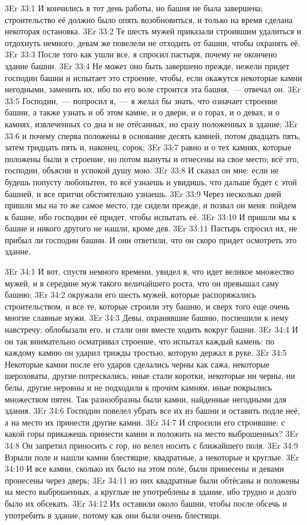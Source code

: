 \vs 3Er 33:1
И кончились в тот день
работы, но башня не была завершена; строительство её должно было опять
возобновиться, и только на время сделана некоторая остановка.
\vs 3Er 33:2
Те шесть мужей приказали
строившим удалиться и отдохнуть немного; девам же повелели не отходить от
башни, чтобы охранять её.
\vs 3Er 33:3
После того как ушли все, я
спросил пастыря, почему не окончено здание башни.
\vs 3Er 33:4
Не может оно быть
завершено прежде, нежели придет господин башни и испытает это строение, чтобы,
если окажутся некоторые камни негодными, заменить их, ибо по его воле строится
эта башня,~--- отвечал он.
\vs 3Er 33:5
Господин,~--- попросил я,~---
я желал бы знать, что означает строение башни, а также узнать и об этом камне,
и о двери, и о горах, и о девах, и о камнях, извлеченных со дна и не
отёсанных, но сразу положенных в здание;
\vs 3Er 33:6
и почему сперва положены в
основание десять камней, потом двадцать пять, затем тридцать пять и, наконец,
сорок;
\vs 3Er 33:7
равно и о тех камнях,
которые положены были в строение, но потом вынуты и отнесены на свое место;
всё это, господин, объясни и успокой душу мою.
\vs 3Er 33:8
И сказал он мне: если не
будешь попусту любопытен, то всё узнаешь и увидишь, что дальше будет с этой
башней, и все притчи обстоятельно узнаешь.
\vs 3Er 33:9
Через несколько дней
пришли мы на то же самое место, где сидели прежде, и позвал он меня: пойдем к
башне, ибо господин её придет, чтобы испытать её.
\vs 3Er 33:10
И пришли мы к башне и
никого другого не нашли, кроме дев.
\vs 3Er 33:11
Пастырь спросил их, не
прибыл ли господин башни. И они ответили, что он скоро придет осмотреть это
здание.

\vs 3Er 34:1
И вот, спустя немного
времени, увидел я, что идет великое множество мужей, и в середине муж такого
величайшего роста, что он превышал саму башню;
\vs 3Er 34:2
окружали его шесть мужей,
которые распоряжались строительством, и все те, которые строили эту башню, и
сверх того еще очень многие славные мужи.
\vs 3Er 34:3
Девы, охранявшие башню,
поспешили к нему навстречу; облобызали его, и стали они вместе ходить вокруг
башни.
\vs 3Er 34:4
И он так внимательно
осматривал строение, что испытал каждый камень: по каждому камню он ударил
трижды тростью, которую держал в руке.
\vs 3Er 34:5
Некоторые камни после его
ударов сделались черны как сажа, некоторые шероховаты, другие потрескались,
иные стали коротки, некоторые ни черны, ни белы, другие неровны и не подходили
к прочим камням, иные покрылись множеством пятен. Так разнообразны были камни,
найденные негодными для здания.
\vs 3Er 34:6
Господин повелел убрать
все их из башни и оставить подле неё, а на место их принести другие камни.
\vs 3Er 34:7
И спросили его строившие:
с какой горы прикажешь принести камни и положить на место выброшенных?
\vs 3Er 34:8
Он запретил приносить с
гор, но велел носить с ближайшего поля.
\vs 3Er 34:9
Взрыли поле и нашли камни
блестящие, квадратные, а некоторые и круглые.
\vs 3Er 34:10
И все камни, сколько их
было на этом поле, были принесены и девами пронесены через дверь;
\vs 3Er 34:11
из них квадратные были
обтёсаны и положены на место выброшенных, а круглые не употреблены в здание,
ибо трудно и долго было их обсекать.
\vs 3Er 34:12
Их оставили около башни,
чтобы после обсечь и употребить в здание, потому как они были очень блестящи.

